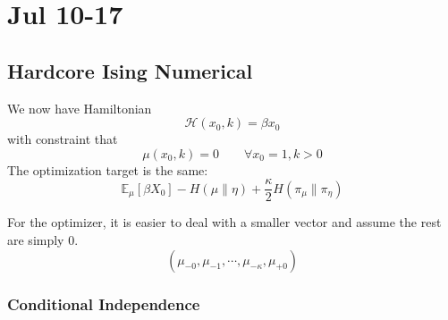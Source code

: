 \documentclass[12pt]{article}
\numberwithin{equation}{section}
\begin{document}
\newpage

\section{Jul 10-17}

\subsection{Hardcore Ising Numerical}
We now have Hamiltonian
\begin{equation}
    \mathcal{H}(x_0, k) = \beta x_0
\end{equation}
with constraint that
\begin{equation}
    \mu(x_0, k) = 0 \qquad \forall x_0=1, k>0
\end{equation}
The optimization target is the same:
\begin{equation*}
    \mathbb{E}_\mu[\beta X_0] - H(\mu \| \eta) + \frac\kappa2 H(\pi_\mu \| \pi_\eta)
\end{equation*}

For the optimizer, it is easier to deal with a smaller vector and assume the rest are simply 0.
\begin{equation*}
    (\mu_{-0}, \mu_{-1}, \cdots, \mu_{-\kappa}, \mu_{+0})
\end{equation*}

\subsubsection{Conditional Independence}
\end{document}
